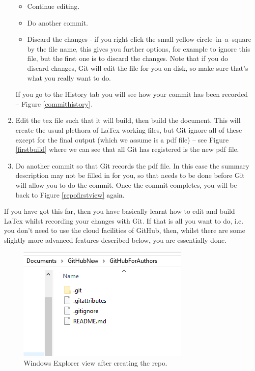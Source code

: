\documentclass[a4paper, 12pt]{article}
\begin{document}
\begin{enumerate}
\begin{itemize}
\item Continue editing.
\item Do another commit.
\item Discard the changes - if you right click the small yellow circle--in--a--square by the file name, this gives you further options, for example to ignore this file, but the first one is to discard the changes. Note that if you do discard changes, Git will edit the file for you on disk, so make sure that's what you really want to do. 
\end{itemize}
If you go to the History tab you will see how your commit has been recorded -- Figure \ref{commithistory}.
\item Edit the tex file such that it will build, then build the document. This will create the usual plethora of LaTex working files, but Git ignore all of these except for the final output (which we assume is a pdf file) -- see Figure \ref{firstbuild} where we can see that all Git has registered is the new pdf file.
\item Do another commit so that Git records the pdf file. In this case the summary description may not be filled in for you, so that needs to be done before Git will allow you to do the commit. Once the commit completes, you will be back to Figure \ref{repofirstview} again.
\end{enumerate}
If you have got this far, then you have basically learnt how to edit and build LaTex whilst recording your changes with Git. If that is all you want to do, i.e. you don't need to use the cloud facilities of GitHub, then, whilst there are some slightly more advanced features described below, you are essentially done.

\begin{figure}
\centering
\includegraphics{NewRepoFirstViewExplorer}
\caption{Windows Explorer view after creating the repo.}
\label{repofirstviewexplorer}
\end{figure}
\end{document}
